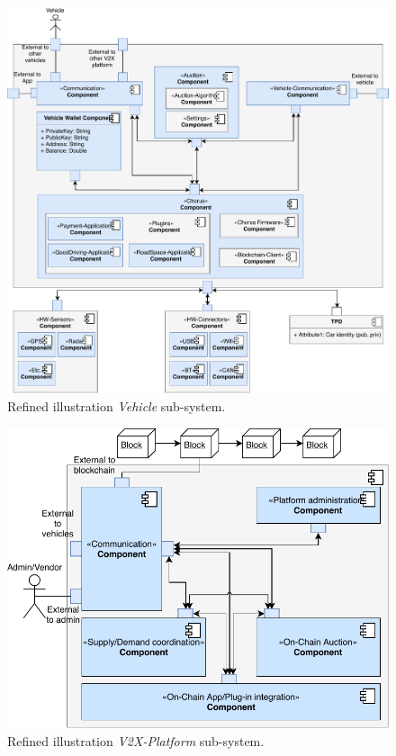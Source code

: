 \documentclass{llncs}
\begin{document}
{				\begin{figure}[H]
					\centering
					\includegraphics[scale=0.65]{Figures/longterm-architecture/20180507_Refined-sys-architecture--vehicle.pdf}
					\caption{Refined illustration \textit{Vehicle} sub-system.}	
					\label{fig:system-architecture--vehicle}
				\end{figure}
				
				\begin{figure}[H]
					\centering
					\includegraphics[scale=0.75]{Figures/longterm-architecture/20180507_Refined-sys-architecture--V2X.pdf}
					\caption{Refined illustration \textit{V2X-Platform} sub-system.}	
					\label{fig:system-architecture--platform}
				\end{figure}						

}
\end{document}
